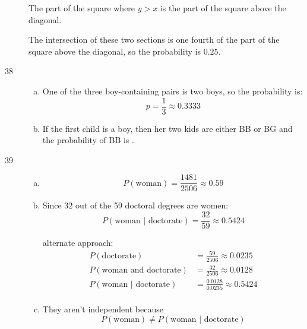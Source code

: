 \documentclass[letterpaper, landscape]{exam}
\begin{document}
\begin{description}
        The part of the square where $y > x$ is the part of the square above the
        diagonal.

        The intersection of these two sections is one fourth of the part of the
        square above the diagonal, so the probability is $\boxed{ 0.25 }$.

      \item[38]
        \begin{enumerate}[(a)]
          \item One of the three boy-containing pairs is two boys, so the
            probability is:
            \[
              p = \frac{1}{3} \approx \boxed{ 0.3333 }
            \]

          \item If the first child is a boy, then her two kids are either BB or
            BG and the probability of BB is .
        \end{enumerate}

      \item[39]
        \begin{enumerate}[(a)]
          \item 
            \[
              P(\text{woman}) = \frac{1481}{2506} \approx \boxed{ 0.59 }
            \]

          \item
            Since 32 out of the 59 doctoral degrees are women:
            \[
              P( \text{woman } | \text { doctorate} ) = \frac{32}{59} 
                \approx \boxed{ 0.5424 }
            \]

            alternate approach:
            \begin{align*}
              P( \text{doctorate} )                   & = \frac{59}{2506} \approx 0.0235 \\
              P( \text{woman and doctorate} )         & = \frac{32}{2506} \approx 0.0128 \\
              P( \text{woman } | \text { doctorate} ) & = \frac{0.0128}{0.0235}
                \approx 0.5424 \\
            \end{align*}

          \item They aren't independent because 
            \[
              P(\text {woman}) \neq P( \text{woman } | \text { doctorate} )
            \]

        \end{enumerate}


\end{description}
\end{document}

